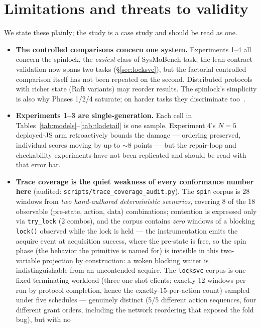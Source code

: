 \documentclass[11pt]{article}
\begin{document}
\section{Limitations and threats to validity}
\label{sec:limitations}

We state these plainly; the study is a case study and should be read as one.

\begin{itemize}
\item \textbf{The controlled comparisons concern one system.} Experiments
  1--4 all concern the spinlock, the \emph{easiest} class of SysMoBench
  task; the lean-contract validation now spans two tasks
  (\S\ref{sec:locksvc}), but the factorial controlled comparison itself has
  not been repeated on the second. Distributed protocols with richer state
  (Raft variants) may reorder results. The spinlock's simplicity is also
  why Phases 1/2/4 saturate; on harder tasks they discriminate
  too~\cite{sigops2026}.
\item \textbf{Experiments 1--3 are single-generation.} Each cell in
  Tables~\ref{tab:models}--\ref{tab:tladetail} is one sample. Experiment 4's
  $N{=}5$ deployed-JS arm retroactively bounds the damage --- ordering
  preserved, individual scores moving by up to $\sim$8 points --- but the
  repair-loop and checkability experiments have not been replicated and
  should be read with that error bar.
\item \textbf{Trace coverage is the quiet weakness of every conformance
  number here} (audited: \texttt{scripts/trace\_coverage\_audit.py}). The
  \texttt{spin} corpus is 28 windows from \emph{two hand-authored
  deterministic scenarios}, covering 8 of the 18 observable
  (pre-state, action, data) combinations; contention is expressed only via
  \texttt{try\_lock} (2 combos), and the corpus contains \emph{zero} windows
  of a blocking \texttt{lock()} observed while the lock is held --- the
  instrumentation emits the acquire event at acquisition success, where the
  pre-state is free, so the spin phase (the behavior the primitive is named
  for) is invisible in this two-variable projection by construction: a woken
  blocking waiter is indistinguishable from an uncontended acquire. The
  \texttt{locksvc} corpus is one fixed terminating workload (three one-shot
  clients; exactly 12 windows per run by protocol completion, hence the
  exactly-15-per-action count) sampled under five schedules --- genuinely
  distinct (5/5 different action sequences, four different grant orders,
  including the network reordering that exposed the fold bug), but with no

\end{itemize}
\end{document}
